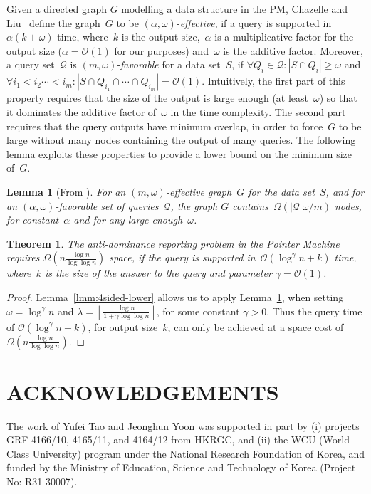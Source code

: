 \documentclass{sig-alternate}
\newtheorem{theorem}{Theorem}
\newtheorem{lemma}{Lemma}
\newcommand{\bigO}{\mathcal{O}}
\renewcommand{\(}{\left(}
\renewcommand{\)}{\right)}
\begin{document}
\begin{fullenv}
Given a directed graph $G$ modelling a data structure in the PM, Chazelle and
Liu~\cite{C90,CL04} define the graph~$G$ to be
$(\alpha,\omega)$-\textit{effective}, if a query is supported in $\alpha(k +
\omega)$ time, where~$k$ is the output size,~$\alpha$ is a multiplicative
factor for the output size ($\alpha = \bigO(1)$ for our purposes) and~$\omega$
is the additive factor.  Moreover, a query set~$\mathcal{Q}$ is
$(m,\omega)$-\textit{favorable} for a data set~$S$, if $\forall Q_i \in
\mathcal{Q}: |S \cap Q_i| \geq \omega$ and $\forall i_1 <i_2 \cdots< i_m: |S
\cap Q_{i_1}\cap \cdots \cap Q_{i_m}| = \bigO(1)$. Intuitively, the first part
of this property requires that the size of the output is large enough (at
least~$\omega$) so that it dominates the additive factor of~$\omega$ in the
time complexity. The second part requires that the query outputs have minimum
overlap, in order to force~$G$ to be large without many nodes containing the
output of many queries. The following lemma exploits these properties to
provide a lower bound on the minimum size of~$G$.

\begin{lemma}[From {\cite[Lemma 2.3]{CL04}}] \label{lem:lower}
  For an $(m,\omega)$-effective graph~$G$ for the data set~$S$, and for an
  $(\alpha,\omega)$-favorable set of queries~$\mathcal{Q}$, the graph $G$
  contains~$\Omega(|\mathcal{Q}|\omega/m)$ nodes, for constant~$\alpha$ and for
  any large enough~$\omega$.
\end{lemma}

\begin{theorem} \label{thm:lower}
  The anti-dominance reporting problem in the Pointer Machine requires
  $\Omega(n\frac{\log{n}}{\log{\log{n}}})$ space, if the query is
  supported in~$\bigO(\log^\gamma{n} + k)$ time, where~$k$ is the size of the
  answer to the query and parameter $\gamma = \bigO(1)$.
\end{theorem}
\begin{proof}
  Lemma~\ref{lmm:4sided-lower} allows us to apply Lemma~\ref{lem:lower}, when
  setting $\omega=\log^\gamma{n}$ and $\lambda=\left\lfloor
  \frac{\log{n}}{1+\gamma\log{\log{n}}}\right \rfloor$, for some constant
  $\gamma>0$. Thus the query time of $\bigO(\log^\gamma{n} + k)$, for output
  size~$k$, can only be achieved at a space cost of
  $\Omega(n\frac{\log{n}}{\log{\log{n}}})$.
\end{proof}
\end{fullenv}





\section*{ACKNOWLEDGEMENTS}

The work of Yufei Tao and Jeonghun Yoon was supported in part by (i) projects GRF 4166/10, 4165/11, and 4164/12 from HKRGC, and (ii) the WCU (World Class University) program under the National Research Foundation of Korea, and funded by the Ministry of Education, Science and Technology of Korea (Project No: R31-30007).



\end{document}
